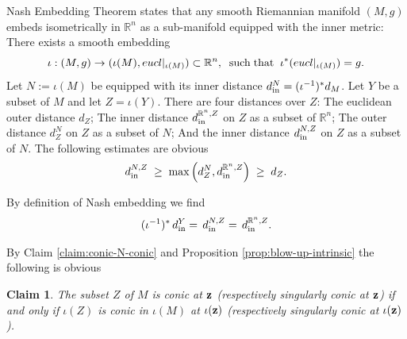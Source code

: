 \documentclass[11pt]{amsart}
\newtheorem{claim}[theorem]{Claim}
\newcommand{\field}[1]{\mathbb{#1}}
\newcommand{\R}{\field{R}}
\newcommand{\bz}{{\bf z}}
\newcommand{\inn}{{{\rm in}}}
\newcommand{\Rn}{{\R^n}}
\numberwithin{equation}{section}
\numberwithin{equation}{section}
\begin{document}
	Nash Embedding Theorem states 
	that any smooth Riemannian manifold $(M,g)$ embeds isometrically in
	$\Rn$ as a sub-manifold equipped with the inner metric: 
	There exists a smooth embedding
	$$
	\iota : (M,g) \to (\iota(M),eucl|_{\iota(M)}) \subset \Rn, \;\; 
	{\rm such} \; {\rm that}\;\;
	\iota^*(eucl|_{\iota(M)}) = g.
	$$
			Let $N := \iota(M)$ be equipped with its inner distance $d_\inn^N=
			(\iota^{-1})^*d_M$. Let $Y$ be a subset of $M$ and let $Z = \iota(Y)$. 
			There are four distances over $Z$: The euclidean outer distance $d_Z$; The inner distance $d_\inn^{\Rn,Z}$ on $Z$ as a subset of $\Rn$; The outer distance 
			$d_Z^N$ on $Z$ as a subset of $N$; And the inner distance $d_\inn^{N,Z}$ on $Z$ as a subset of $N$. The following estimates are obvious
		\begin{equation}\label{eq:Z-4-metrics}
		d_\inn^{N,Z} \; \geq \; \max \left(d_Z^N,d_\inn^{\Rn,Z}\right) \; \geq \; d_Z.
		\end{equation}
     	
			By definition of Nash embedding we find
		\begin{equation}\label{eq:Z-3-metrics}
			(\iota^{-1})^* \, d_\inn^Y = \, d_\inn^{N,Z} = \, d_\inn^{\Rn,Z}.
		\end{equation}

	
	\medskip	
	By Claim \ref{claim:conic-N-conic} and Proposition 
	\ref{prop:blow-up-intrinsic} the following is obvious
	\begin{claim}\label{claim:conic-abstract-M-conic}
		The subset $Z$ of $M$ is conic at $\bz$ (respectively singularly conic
		at $\bz$) if and only if $\iota(Z)$ is conic in $\iota(M)$ at $\iota(\bz)$ 
		(respectively singularly conic at $\iota(\bz)$).
	\end{claim}
	
\end{document}
